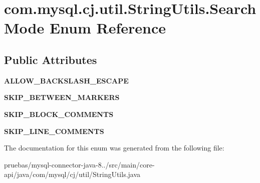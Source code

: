 \hypertarget{enumcom_1_1mysql_1_1cj_1_1util_1_1_string_utils_1_1_search_mode}{}\section{com.\+mysql.\+cj.\+util.\+String\+Utils.\+Search\+Mode Enum Reference}
\label{enumcom_1_1mysql_1_1cj_1_1util_1_1_string_utils_1_1_search_mode}
\subsection*{Public Attributes}
\begin{DoxyCompactItemize}
\item 
\mbox{\label{enumcom_1_1mysql_1_1cj_1_1util_1_1_string_utils_1_1_search_mode_a8a656e8349bbc3457389cf49048fdf74}} 
{\bfseries A\+L\+L\+O\+W\+\_\+\+B\+A\+C\+K\+S\+L\+A\+S\+H\+\_\+\+E\+S\+C\+A\+PE}
\item 
\mbox{\label{enumcom_1_1mysql_1_1cj_1_1util_1_1_string_utils_1_1_search_mode_afc24d2831de3fa5545c66efba6bf712c}} 
{\bfseries S\+K\+I\+P\+\_\+\+B\+E\+T\+W\+E\+E\+N\+\_\+\+M\+A\+R\+K\+E\+RS}
\item 
\mbox{\label{enumcom_1_1mysql_1_1cj_1_1util_1_1_string_utils_1_1_search_mode_a80b25fe71d131591085ac2252b7207c5}} 
{\bfseries S\+K\+I\+P\+\_\+\+B\+L\+O\+C\+K\+\_\+\+C\+O\+M\+M\+E\+N\+TS}
\item 
\mbox{\label{enumcom_1_1mysql_1_1cj_1_1util_1_1_string_utils_1_1_search_mode_a24cc55f3ffd58efcad919bfc80950cb3}} 
{\bfseries S\+K\+I\+P\+\_\+\+L\+I\+N\+E\+\_\+\+C\+O\+M\+M\+E\+N\+TS}
\end{DoxyCompactItemize}


The documentation for this enum was generated from the following file\+:\begin{DoxyCompactItemize}
\item 
pruebas/mysql-\/connector-\/java-\/8../src/main/core-\/api/java/com/mysql/cj/util/String\+Utils.\+java\end{DoxyCompactItemize}
